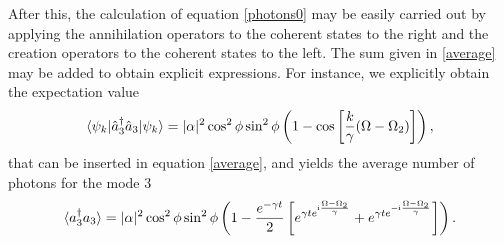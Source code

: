 \documentclass{article}
\newcommand{\mi}{\mathrm{i}}
\newcommand{\op}[1]{\hat{#1}}
\begin{document}
After this, the calculation of equation \eqref{photons0} may be easily carried out by applying the annihilation operators to the coherent states to the right and the creation operators to the coherent states to the left. The sum given in \eqref{average} may be added to obtain explicit expressions.
For instance, we explicitly obtain the expectation value
\begin{equation}\label{photons00}
    \braket{\psi_{k}|\op{a}_{3}^{\dagger}\op{a}_{3}|\psi_{k}}={|\alpha|^2}\cos^2\phi\sin^2 \phi\left(1-\cos\left[\frac{k}{\gamma}(\Omega-\Omega_{2})\right]\right),
\end{equation}
that can be inserted in equation \eqref{average}, and yields the average number of photons for the mode 3
\begin{equation}\label{average00}
    \braket{a_{3}^{\dagger}a_{3}} = {|\alpha|^2}\cos^2\phi\sin^2 \phi \left(1-\frac{e^{-\gamma t}}{2}\left[e^{\gamma t e^{\mi\frac{\Omega-\Omega_2}{\gamma}}}+e^{\gamma t e^{-\mi\frac{\Omega-\Omega_2}{\gamma}}}\right]\right).
\end{equation}
\end{document}
